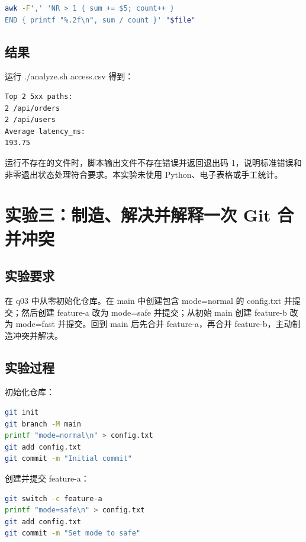 \documentclass[UTF8]{ctexart}
\begin{document}
\begin{lstlisting}[language=bash]
awk -F',' 'NR > 1 { sum += $5; count++ }
END { printf "%.2f\n", sum / count }' "$file"
\end{lstlisting}

\subsection{结果}

运行 ./analyze.sh access.csv 得到：

\begin{lstlisting}
Top 2 5xx paths:
2 /api/orders
2 /api/users
Average latency_ms:
193.75
\end{lstlisting}

运行不存在的文件时，脚本输出文件不存在错误并返回退出码 1，说明标准错误和非零退出状态处理符合要求。本实验未使用 Python、电子表格或手工统计。

\section{实验三：制造、解决并解释一次 Git 合并冲突}

\subsection{实验要求}

在 q03 中从零初始化仓库。在 main 中创建包含 mode=normal 的 config.txt 并提交；然后创建 feature-a 改为 mode=safe 并提交；从初始 main 创建 feature-b 改为 mode=fast 并提交。回到 main 后先合并 feature-a，再合并 feature-b，主动制造冲突并解决。

\subsection{实验过程}

初始化仓库：

\begin{lstlisting}[language=bash]
git init
git branch -M main
printf "mode=normal\n" > config.txt
git add config.txt
git commit -m "Initial commit"
\end{lstlisting}

创建并提交 feature-a：

\begin{lstlisting}[language=bash]
git switch -c feature-a
printf "mode=safe\n" > config.txt
git add config.txt
git commit -m "Set mode to safe"
\end{lstlisting}
\end{document}
